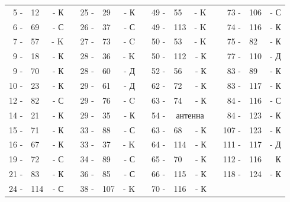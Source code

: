 \documentclass[12pt]{article}
\newcommand{\mc}{\multicolumn}
\begin{document}
\begin{tabular}{r l r p{0.5cm} r l r p{0.5cm} r l r p{0.5cm} r l r}
 5 - & 12  & - К &     & 25 - & 29     &   - К    &      &  49 - &  55 & - K &         &  73 - & 106 & - С\\
 6 - & 69  & - С &     & 26 - & 37     &   - С    &      &  49 - & 113 & - K &         &  74 - & 116 & - К\\
 7 - & 57  & - K &     & 27 - & 73     &   - C    &      &  50 - &  53 & - K &         &  75 - &  82 & - К\\
 9 - & 18  & - К &     & 28 - & 36     &   - K    &      &  50 - & 112 & - К &         &  77 - & 110 & - Д\\
 9 - & 70  & - К &     & 28 - & 60     &   - Д    &      &  52 - &  56 & - К &         &  83 - &  89 & - К\\
10 - & 23  & - К &     & 29 - & 61     &   - Д    &      &  62 - &  72 & - К &         &  83 - & 117 & - К\\
12 - & 82  & - С &     & 29 - & 76     &   - C    &      &  63 - &  74 & - К &         &  84 - & 116 & - С\\
14 - & 21  & - К &     & 29 - & 35     &   - К    &      &  54 - &  \mc{2}{c}{антенна} & &  84 - & 123 & - К\\
15 - & 71  & - К &     & 33 - & 88     &   - С    &      &  63 - &  68 & - К &         & 107 - & 123 & - К\\
16 - & 67  & - К &     & 33 - & 37     &   - K    &      &  64 - & 114 & - К &         & 111 - & 117 & - Д\\
19 - & 72  & - С &     & 34 - & 89     &   - С    &      &  65 - &  70 & - К &         & 112 - & 116 &   К\\
21 - & 83  & - К &     & 36 - & 85     &   - С    &      &  66 - & 115 & - К &         & 118 - & 124 & - К\\
24 - & 114 & - С &     & 38 - & 107    &   - K    &      &  70 - & 116 & - К &         &       &     &    \\
\end{tabular}

\hrulefill
\end{document}
